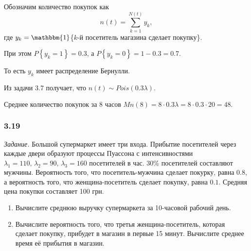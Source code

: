 Обозначим количество покупок как
$$n \left( t \right) =
  \sum \limits_{k = 1}^{N \left( t \right) } y_k,$$
где $y_k = \mathbbm{1}$\{$k$-й посетитель магазина сделает покупку\}.

При этом $P \left\{ y_k = 1 \right\} = 0.3$, а $P \left\{ y_k = 0 \right\} = 1 - 0.3 = 0.7$.

То есть $y_k$ имеет распределение Бернулли.

Из задачи 3.7 получает, что $n \left( t \right) \sim Pois \left( 0.3 \lambda \right) $.

Среднее количество покупок за 8 часов
$Mn \left( 8 \right) =
  8 \cdot 0.3 \lambda =
  8 \cdot 0.3 \cdot 20 =
  48$.

\subsubsection*{3.19}

\textit{Задание.}
Большой супермаркет имеет три входа.
Прибытие посетителей через каждые двери образуют процессы Пуассона с интенсивностями
$ \lambda_1 = 110, \, \lambda_2 = 90, \, \lambda_3 = 160$ посетителей в час.
30\% посетителей составляют мужчины.
Вероятность того, что посетитель-мужчина сделает покурку, равна $0.8$, а вероятность того,
что женщина-посетитель сделает покупку, равна $0.1$.
Средняя цена покупки составляет 100 грн.
\begin{enumerate}[label=\alph*)]
  \item Вычислите среднюю выручку супермаркета за 10-часовой рабочий день.
  \item Вычислите вероятность того, что третья женщина-посетитель, которая сделает покупку,
  прибудет в магазин в первые 15 минут.
  Вычислите среднее время её прибытия в магазин.
\end{enumerate}

